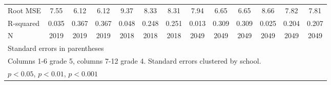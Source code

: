 {\begin{tabular}{l*{12}{c}}
\midrule
Root MSE    &        7.55         &        6.12         &        6.12         &        9.37         &        8.33         &        8.31         &        7.94         &        6.65         &        6.65         &        8.66         &        7.82         &        7.81         \\
R-squared   &       0.035         &       0.367         &       0.367         &       0.048         &       0.248         &       0.251         &       0.013         &       0.309         &       0.309         &       0.025         &       0.204         &       0.207         \\
N           &        2019         &        2019         &        2019         &        2018         &        2018         &        2018         &        2049         &        2049         &        2049         &        2049         &        2049         &        2049         \\
\bottomrule
\multicolumn{13}{l}{\footnotesize Standard errors in parentheses}\\
\multicolumn{13}{l}{\footnotesize Columns 1-6 grade 5, columns 7-12 grade 4. Standard errors clustered by school.}\\
\multicolumn{13}{l}{\footnotesize \sym{*} \(p<0.05\), \sym{**} \(p<0.01\), \sym{***} \(p<0.001\)}\\
\end{tabular}
}
